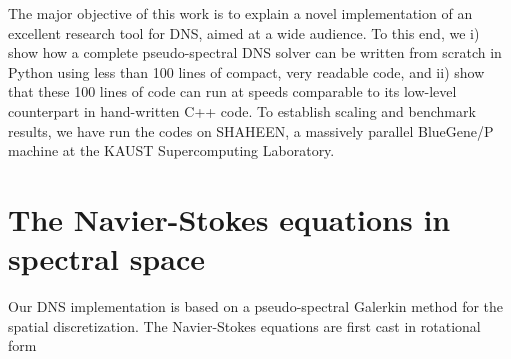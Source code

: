 \documentclass[11pt, oneside]{article}
\begin{document}
The major objective of this work is to explain a novel implementation of an excellent research tool for DNS, aimed at a wide audience. To this end, we i) show how a complete pseudo-spectral DNS solver can be written from scratch in Python using less than 100 lines of compact, very readable code, and ii) show that these 100 lines of code can run at speeds comparable to its low-level counterpart in hand-written C++ code. To establish scaling and benchmark results, we have run the codes on SHAHEEN, a massively parallel BlueGene/P machine at the KAUST Supercomputing Laboratory.

\section{The Navier-Stokes equations in spectral space}
Our DNS implementation is based on a pseudo-spectral Galerkin method \cite{canuto1987} for the spatial discretization. The Navier-Stokes equations are first cast in rotational form
\end{document}

